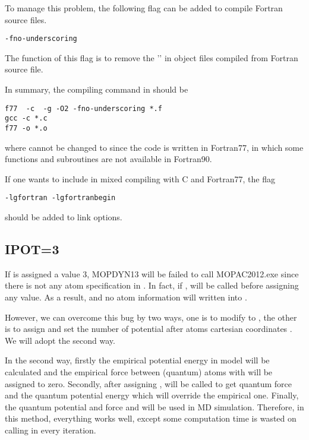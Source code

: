 \documentclass[11pt]{JHEP3}
\begin{document}
To manage this problem, the following flag can be added to compile
Fortran source files.
\begin{lstlisting}
-fno-underscoring
\end{lstlisting}
The function of this flag is to remove the '\mcode{_}' in object
files compiled from Fortran source file.

In summary, the compiling command in  should be
\begin{lstlisting}
f77  -c  -g -O2 -fno-underscoring *.f
gcc -c *.c
f77 -o *.o
\end{lstlisting}
where  cannot be changed to  since the
code is written in Fortran77, in which some functions and
subroutines are not available in Fortran90.

If one wants to include  in mixed compiling with C and
Fortran77, the flag
\begin{lstlisting}
-lgfortran -lgfortranbegin
\end{lstlisting}
should be added to link options.


\subsection{IPOT=3}\label{sec:ipot3}
If  is assigned a value $3$, MOPDYN13 will be failed to
call MOPAC2012.exe since there is not any atom specification in
. In fact, if ,  will be called before assigning
 any value. As a result,  and
no atom information will written into .

However, we can overcome this bug by two ways, one is to modify
 to , the
other is to assign  and set the number of potential
after atoms cartesian coordinates . We will adopt the
second way.

In the second way, firstly the empirical potential energy
 in model  will be calculated and the
empirical force between (quantum) atoms with  will be
assigned to zero. Secondly, after assigning
,  will be called to get quantum force
 and the quantum potential energy  which
will override the empirical one. Finally, the quantum potential and
force  and  will be used in MD simulation.
Therefore, in this method, everything works well, except some
computation time is wasted on calling  in
every iteration.
\end{document}
